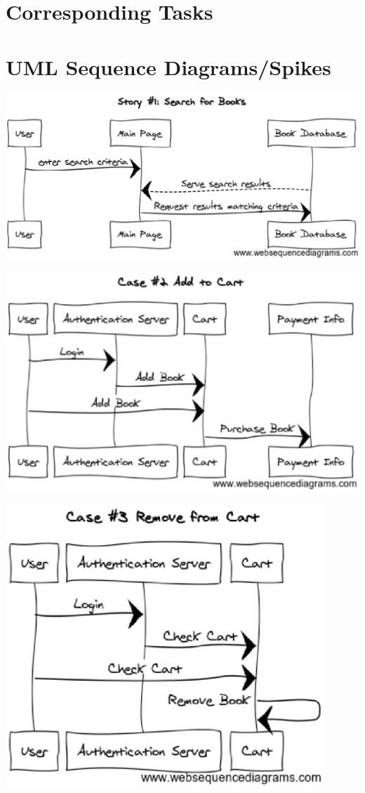 \documentclass[12pt]{article}
\begin{document}
	\section{Corresponding Tasks}



	\section{UML Sequence Diagrams/Spikes}
		\includegraphics[width=16cm]{story1.eps}
		\par
		\includegraphics[width=14cm]{story2.eps}
		\par
		\includegraphics[width=12cm]{story3.eps}
\end{document}
